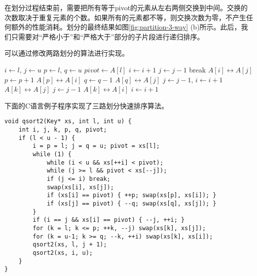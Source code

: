 \documentclass[UTF8]{article}
\begin{document}
在划分过程结束前，需要把所有等于pivot的元素从左右两侧交换到中间。交换的次数取决于重复元素的个数。如果所有的元素都不等，则交换次数为零，不产生任何额外的性能消耗。划分的最终结果如图\ref{fig:partition-3-way} (b)所示。此后，我们只需要对“严格小于”和“严格大于”部分的子片段进行递归排序。

可以通过修改两路划分的算法进行实现。

\begin{algorithmic}[1]
    \State $i \gets l$, $j \gets u$
    \State $p \gets l$, $q \gets u$ 
    \State $pivot \gets A[l]$
    \Loop
      \Repeat
        \State $i \gets i + 1$
       
      \Repeat
        \State $j \gets j - 1$
       
        \State break 
      \EndIf
      \State {} $A[i] \leftrightarrow A[j]$
       
        \State $p \gets p + 1$
        \State {} $A[p] \leftrightarrow A[i]$
      \EndIf
        \State $q \gets q - 1$
        \State {} $A[q] \leftrightarrow A[j]$
      \EndIf
    \EndLoop
     
      \State $j \gets j - 1$, $i \gets i + 1$
    \EndIf
     
      \State {} $A[k] \leftrightarrow A[j]$
      \State $j \gets j - 1$
    \EndFor
      \State {} $A[k] \leftrightarrow A[i]$
      \State $i \gets i + 1$
    \EndFor
    \State {}
    \State {}
  \EndIf
\EndProcedure
\end{algorithmic}

下面的C语言例子程序实现了三路划分快速排序算法。

\lstset{language=C}
\begin{lstlisting}
void qsort2(Key* xs, int l, int u) {
    int i, j, k, p, q, pivot;
    if (l < u - 1) {
        i = p = l; j = q = u; pivot = xs[l];
        while (1) {
            while (i < u && xs[++i] < pivot);
            while (j >= l && pivot < xs[--j]);
            if (j <= i) break;
            swap(xs[i], xs[j]);
            if (xs[i] == pivot) { ++p; swap(xs[p], xs[i]); }
            if (xs[j] == pivot) { --q; swap(xs[q], xs[j]); }
        }
        if (i == j && xs[i] == pivot) { --j, ++i; }
        for (k = l; k <= p; ++k, --j) swap(xs[k], xs[j]);
        for (k = u-1; k >= q; --k, ++i) swap(xs[k], xs[i]);
        qsort2(xs, l, j + 1);
        qsort2(xs, i, u);
    }
}
\end{lstlisting}
\end{document}
